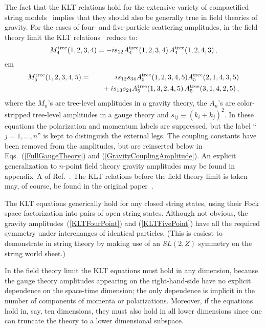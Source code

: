 The fact that the KLT relations hold for the extensive
variety of compactified string models~\cite{Narain86,Narain87,
Dixon85,Dixon86,Kawai87,Antoniadis87} implies that they should
also be generally true in field theories of gravity.
For the cases of four- and five-particle scattering amplitudes, in the
field theory limit the KLT relations~\cite{KLT} reduce to:
%
\begin{equation}
M_4^{\rm tree}  (1,2,3,4) = 
 - i s_{12} A_4^{\rm tree} (1,2,3,4) \, A_4^{\rm tree}(1,2,4,3)\,,
\label{KLTFourPoint}
\end{equation}
%
%
 em
\begin{eqnarray}
M_5^{\rm tree}(1,2,3,4,5) & = &
i s_{12} s_{34}  A_5^{\rm tree}(1,2,3,4,5)
                                 A_5^{\rm tree}(2,1,4,3,5) \nonumber\\
&& \hskip .3 cm \null
 + i s_{13}s_{24} A_5^{\rm tree}(1,3,2,4,5) \, A_5^{\rm tree}(3,1,4,2,5)\,,
\label{KLTFivePoint}
\end{eqnarray}
%
where the $M_n$'s are tree-level amplitudes in a gravity theory, the
$A_n$'s are color-stripped tree-level amplitudes in a gauge theory and
$s_{ij}\equiv (k_i+k_j)^2$. In these equations the polarization and
momentum labels are suppressed, but the label ``$j= 1,\ldots, n$'' is
kept to distinguish the external legs.  The coupling constants have
been removed from the amplitudes, but are reinserted below in
Eqs.~(\ref{FullGaugeTheory}) and (\ref{GravityCouplingAmplitude}).  An
explicit generalization to $n$-point field theory gravity amplitudes
may be found in appendix~A of Ref.~\cite{MHVGrav}.  The KLT relations
before the field theory limit is taken may, of course, be found in the
original paper~\cite{KLT}.

The KLT equations generically hold for any closed string states, using
their Fock space factorization into pairs of open string states.
Although not obvious, the gravity amplitudes~(\ref{KLTFourPoint}) and
(\ref{KLTFivePoint}) have all the required symmetry under interchanges
of identical particles.  (This is easiest to demonstrate in string
theory by making use of an $SL(2,Z)$ symmetry on the string world
sheet.)  

In the field theory limit the KLT equations must hold in any
dimension, because the gauge theory amplitudes appearing on the
right-hand-side have no explicit dependence on the space-time
dimension; the only dependence is implicit in the number of components
of momenta or polarizations.  Moreover, if the equations hold in, say,
ten dimensions, they must also hold in all lower dimensions since one
can truncate the theory to a lower dimensional subspace.

